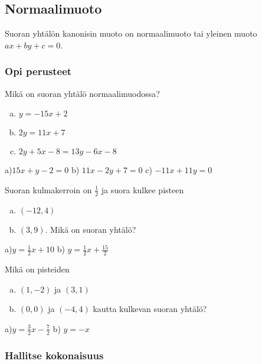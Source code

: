 \subsection*{Normaalimuoto}

Suoran yhtälön kanonisin muoto on normaalimuoto tai yleinen muoto $ax+by+c=0$.

\begin{tehtavasivu}

\subsubsection*{Opi perusteet}

\begin{tehtava}
Mikä on suoran yhtälö normaalimuodossa?
\begin{enumerate}[a)]
\item $y=-15x+2$
\item $2y=11x+7$
\item $2y+5x-8=13y-6x-8$
\end{enumerate}
\begin{vastaus}
a)$15x+y-2=0$ b) $11x-2y+7=0$ c) $-11x+11y=0$
\end{vastaus}
\end{tehtava}


\begin{tehtava}
Suoran kulmakerroin on $\frac{1}{2}$ ja suora kulkee pisteen
\begin{enumerate}[a)]
\item $(-12,4)$
\item $(3,9)$. Mikä on suoran yhtälö?
\end{enumerate}
\begin{vastaus}
a)$y=\frac{1}{2}x+10$ b) $y=\frac{1}{2}x+\frac{15}{2}$
\end{vastaus}
\end{tehtava}

\begin{tehtava}
Mikä on pisteiden
\begin{enumerate}[a)]
\item $(1,-2)$ ja $(3,1)$
\item $(0,0)$ ja $(-4,4)$ kautta kulkevan suoran yhtälö?
\end{enumerate}
\begin{vastaus}
a)$y=\frac{3}{2}x-\frac{7}{2}$ b) $y=-x$
\end{vastaus}
\end{tehtava}

\subsubsection*{Hallitse kokonaisuus}


\end{tehtavasivu}
